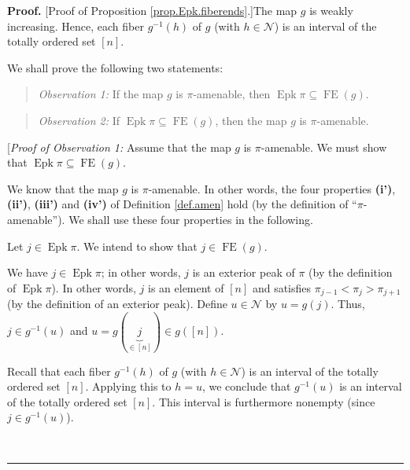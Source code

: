 \documentclass[numbers=enddot,12pt,final,onecolumn,notitlepage]{scrartcl}%
\theoremstyle{definition}
\newenvironment{statement}{\begin{quote}}{\end{quote}}
\newenvironment{proof}[1][Proof]{\noindent\textbf{#1.} }{\ \rule{0.5em}{0.5em}}
\newenvironment{verlong}{}{}
\begin{document}
\begin{verlong}
\begin{proof}
[Proof of Proposition \ref{prop.Epk.fiberends}.]The map $g$ is weakly
increasing. Hence, each fiber $g^{-1}\left(  h\right)  $ of $g$ (with
$h\in\mathcal{N}$) is an interval of the totally ordered set $\left[
n\right]  $.

We shall prove the following two statements:

\begin{statement}
\textit{Observation 1:} If the map $g$ is $\pi$-amenable, then
$\operatorname{Epk}\pi\subseteq\operatorname*{FE}\left(  g\right)  $.
\end{statement}

\begin{statement}
\textit{Observation 2:} If $\operatorname{Epk}\pi\subseteq\operatorname*{FE}%
\left(  g\right)  $, then the map $g$ is $\pi$-amenable.
\end{statement}

[\textit{Proof of Observation 1:} Assume that the map $g$ is $\pi$-amenable.
We must show that $\operatorname{Epk}\pi\subseteq\operatorname*{FE}\left(
g\right)  $.

We know that the map $g$ is $\pi$-amenable. In other words, the four
properties \textbf{(i')}, \textbf{(ii')}, \textbf{(iii')} and \textbf{(iv')}
of Definition \ref{def.amen} hold (by the definition of \textquotedblleft$\pi
$-amenable\textquotedblright). We shall use these four properties in the following.

Let $j\in\operatorname{Epk}\pi$. We intend to show that $j\in
\operatorname*{FE}\left(  g\right)  $.

We have $j\in\operatorname{Epk}\pi$; in other words, $j$ is an exterior peak
of $\pi$ (by the definition of $\operatorname{Epk}\pi$). In other words, $j$
is an element of $\left[  n\right]  $ and satisfies $\pi_{j-1}<\pi_{j}%
>\pi_{j+1}$ (by the definition of an exterior peak). Define $u\in\mathcal{N}$
by $u=g\left(  j\right)  $. Thus, $j\in g^{-1}\left(  u\right)  $ and
$u=g\left(  \underbrace{j}_{\in\left[  n\right]  }\right)  \in g\left(
\left[  n\right]  \right)  $.

Recall that each fiber $g^{-1}\left(  h\right)  $ of $g$ (with $h\in
\mathcal{N}$) is an interval of the totally ordered set $\left[  n\right]  $.
Applying this to $h=u$, we conclude that $g^{-1}\left(  u\right)  $ is an
interval of the totally ordered set $\left[  n\right]  $. This interval is
furthermore nonempty (since $j\in g^{-1}\left(  u\right)  $).


\end{proof}
\end{verlong}
\end{document}
